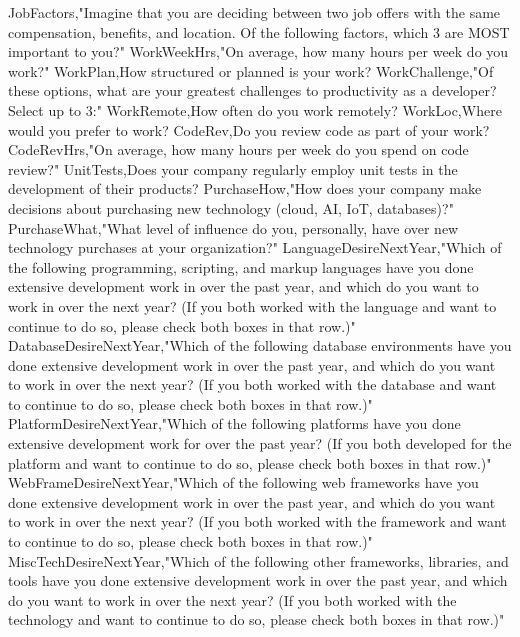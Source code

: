 \documentclass{dyplom}
\begin{document}
JobFactors,"Imagine that you are deciding between two job offers with the same compensation, benefits, and location. Of the following factors, which 3 are MOST important to you?"
WorkWeekHrs,"On average, how many hours per week do you work?"
WorkPlan,How structured or planned is your work?
WorkChallenge,"Of these options, what are your greatest challenges to productivity as a developer? Select up to 3:"
WorkRemote,How often do you work remotely?
WorkLoc,Where would you prefer to work?
CodeRev,Do you review code as part of your work?
CodeRevHrs,"On average, how many hours per week do you spend on code review?"
UnitTests,Does your company regularly employ unit tests in the development of their products?
PurchaseHow,"How does your company make decisions about purchasing new technology (cloud, AI, IoT, databases)?"
PurchaseWhat,"What level of influence do you, personally, have over new technology purchases at your organization?"
LanguageDesireNextYear,"Which of the following programming, scripting, and markup languages have you done extensive development work in over the past year, and which do you want to work in over the next year?  (If you both worked with the language and want to continue to do so, please check both boxes in that row.)"
DatabaseDesireNextYear,"Which of the following database environments have you done extensive development work in over the past year, and which do you want to work in over the next year?   (If you both worked with the database and want to continue to do so, please check both boxes in that row.)"
PlatformDesireNextYear,"Which of the following platforms have you done extensive development work for over the past year?   (If you both developed for the platform and want to continue to do so, please check both boxes in that row.)"
WebFrameDesireNextYear,"Which of the following web frameworks have you done extensive development work in over the past year, and which do you want to work in over the next year? (If you both worked with the framework and want to continue to do so, please check both boxes in that row.)"
MiscTechDesireNextYear,"Which of the following other frameworks, libraries, and tools have you done extensive development work in over the past year, and which do you want to work in over the next year? (If you both worked with the technology and want to continue to do so, please check both boxes in that row.)"
\end{document}
